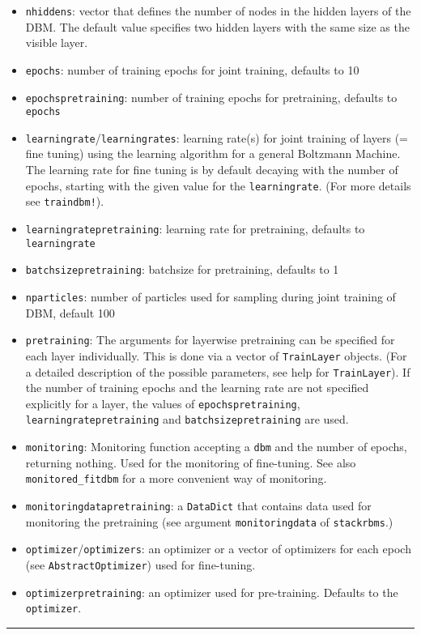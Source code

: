 \begin{itemize}
\item \texttt{nhiddens}: vector that defines the number of nodes in the hidden layers of  the DBM. The default value specifies two hidden layers with the same size  as the visible layer.


\item \texttt{epochs}: number of training epochs for joint training, defaults to 10


\item \texttt{epochspretraining}: number of training epochs for pretraining,  defaults to \texttt{epochs}


\item \texttt{learningrate}/\texttt{learningrates}:  learning rate(s) for joint training of layers (= fine tuning)  using the learning algorithm for a general Boltzmann Machine.  The learning rate for fine tuning is by default decaying with the number of epochs,  starting with the given value for the \texttt{learningrate}.  (For more details see \texttt{traindbm!}).


\item \texttt{learningratepretraining}: learning rate for pretraining,  defaults to \texttt{learningrate}


\item \texttt{batchsizepretraining}: batchsize for pretraining, defaults to 1


\item \texttt{nparticles}: number of particles used for sampling during joint training of  DBM, default 100


\item \texttt{pretraining}: The arguments for layerwise pretraining  can be specified for each layer individually.  This is done via a vector of \texttt{TrainLayer} objects.  (For a detailed description of the possible parameters,  see help for \texttt{TrainLayer}).  If the number of training epochs and the learning rate are not specified  explicitly for a layer, the values of \texttt{epochspretraining},  \texttt{learningratepretraining} and \texttt{batchsizepretraining} are used.


\item \texttt{monitoring}: Monitoring function accepting a \texttt{dbm} and the number of epochs,  returning nothing. Used for the monitoring of fine-tuning.  See also \texttt{monitored\_fitdbm} for a more convenient way of monitoring.


\item \texttt{monitoringdatapretraining}: a \texttt{DataDict} that contains data used for  monitoring the pretraining (see argument \texttt{monitoringdata} of \texttt{stackrbms}.)


\item \texttt{optimizer}/\texttt{optimizers}: an optimizer or a vector of optimizers for each epoch  (see \texttt{AbstractOptimizer}) used for fine-tuning.


\item \texttt{optimizerpretraining}: an optimizer used for pre-training.  Defaults to the \texttt{optimizer}.

\end{itemize}
\noindent\rule{\textwidth}{1pt}
